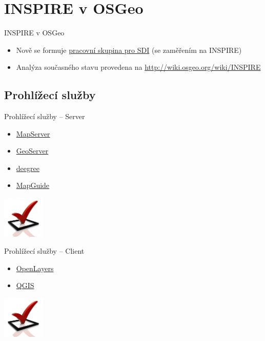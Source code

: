 \documentclass[xcolor=dvipsnames]{beamer}
\begin{document}
\section{INSPIRE v OSGeo}

\begin{frame}{INSPIRE v OSGeo}
    \begin{itemize}
        \item Nově se formuje
            \href{http://wiki.osgeo.org/wiki/SDI_committee}{pracovní skupina pro
            SDI} (se zaměřením na INSPIRE)
        \item Analýza současného stavu provedena na
            \url{http://wiki.osgeo.org/wiki/INSPIRE} {\em } 
    \end{itemize}
\end{frame}

\subsection{Prohlížecí služby}
\begin{frame}{Prohlížecí služby -- Server}
    \begin{itemize}
        \item \href{http://mapserver.org}{MapServer}
        \item \href{http://geoserver.org}{GeoServer}
        \item \href{http://deegree.org}{deegree}
        \item \href{http://mapguide.osgeo.org}{MapGuide}
    \end{itemize}
    \begin{flushright} \includegraphics[width=2cm]{imgs/ils/done.jpg} \end{flushright} 
\end{frame}

\begin{frame}{Prohlížecí služby -- Client}
    \begin{itemize}
        \item \href{http://openlayers.org}{OpenLayers}
        \item \href{http://qgis.org}{QGIS}
    \end{itemize}
    \begin{flushright} \includegraphics[width=2cm]{imgs/ils/done.jpg} \end{flushright}
\end{frame}
\end{document}
